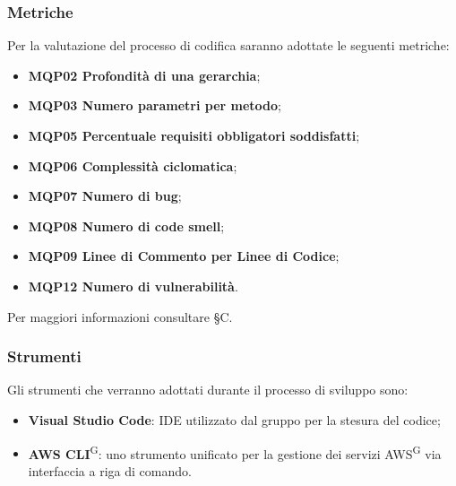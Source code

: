 \subsubsection{Metriche}
Per la valutazione del processo di codifica saranno adottate le seguenti metriche:
\begin{itemize}
\item \textbf{MQP02 Profondità di una gerarchia};
\item \textbf{MQP03 Numero parametri per metodo};
\item \textbf{MQP05 Percentuale requisiti obbligatori soddisfatti};
\item \textbf{MQP06 Complessità ciclomatica};
\item \textbf{MQP07 Numero di bug};
\item \textbf{MQP08 Numero di code smell};
\item \textbf{MQP09 Linee di Commento per Linee di Codice};
\item \textbf{MQP12 Numero di vulnerabilità}.
\end{itemize}
Per maggiori informazioni consultare \S{}C.

\subsubsection{Strumenti}
Gli strumenti che verranno adottati durante il processo di sviluppo sono:
\begin{itemize}
\item \textbf{Visual Studio Code}: IDE utilizzato dal gruppo per la stesura del codice;
\item \textbf{AWS CLI}\textsuperscript{G}: uno strumento unificato per la gestione dei servizi AWS\textsuperscript{G} via interfaccia a riga di comando.
\end{itemize}
